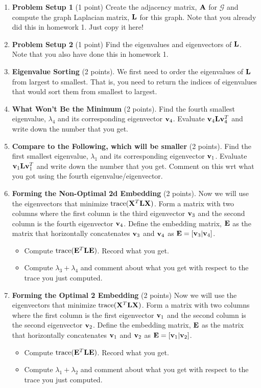 \documentclass{article}
\begin{document}
\begin{enumerate}
\item {\bf Problem Setup 1} (1 point) Create the adjacency matrix, ${\bf A}$ for $\mathcal{G}$ and compute the graph Laplacian matrix, ${\bf L}$ for this graph. Note that you already did this in homework 1. Just copy it here! 
\item {\bf Problem Setup 2} (1 point) Find the eigenvalues and eigenvectors of ${\bf L}$. Note that you also have done this in homework 1. 
\item {\bf Eigenvalue Sorting} (2 points). We first need to order the eigenvalues of ${\bf L}$ from largest to smallest. That is, you need to return the indices of eigenvalues that would sort them from smallest to largest. 
\item {\bf What Won't Be the Minimum} (2 points). Find the fourth smallest eigenvalue, ${\lambda}_{4}$ and its corresponding eigenvector ${\bf v}_{4}$. Evaluate ${\bf v}_{4}{\bf L}{\bf v}_{4}^{T}$ and write down the number that you get. 
\item {\bf Compare to the Following, which will be smaller} (2 points). Find the first smallest eigenvalue, ${\lambda}_{1}$ and its corresponding eigenvector ${\bf v}_{1}$. Evaluate ${\bf v}_{1}{\bf L}{\bf v}_{1}^{T}$ and write down the number that you get. Comment on this wrt what you got using the fourth eigenvalue/eigenvector. 
\item {\bf Forming the Non-Optimal 2d Embedding} (2 points). Now we will use the eigenvectors that minimize $\text{trace}({\bf X}^{T}{\bf L}{\bf X})$. Form a matrix with two columns where the first column is the third eigenvector ${\bf v}_{3}$ and the second column is the fourth eigenvector ${\bf v}_{4}$. Define the embedding matrix, ${\bf E}$ as the matrix that horizontally concatenates ${\bf v}_{3}$ and ${\bf v}_{4}$ as ${\bf E}=[{\bf v}_{3} | {\bf v}_{4}]$. 
\begin{itemize}
\item Compute $\text{trace}({\bf E}^{T}{\bf L}{\bf E})$. Record what you get.
\item Compute $\lambda_{3}+\lambda_{4}$ and comment about what you get with respect to the trace you just computed. 
\end{itemize}
\item {\bf Forming the Optimal 2 Embedding} (2 points) Now we will use the eigenvectors that minimize $\text{trace}({\bf X}^{T}{\bf L}{\bf X})$. Form a matrix with two columns where the first column is the first eigenvector ${\bf v}_{1}$ and the second column is the second eigenvector ${\bf v}_{2}$. Define the embedding matrix, ${\bf E}$ as the matrix that horizontally concatenates ${\bf v}_{1}$ and ${\bf v}_{2}$ as ${\bf E}=[{\bf v}_{1} | {\bf v}_{2}]$. 
\begin{itemize}
\item Compute $\text{trace}({\bf E}^{T}{\bf L}{\bf E})$. Record what you get.
\item Compute $\lambda_{1}+\lambda_{2}$ and comment about what you get with respect to the trace you just computed. 
\end{itemize}

\end{enumerate}
\end{document}
